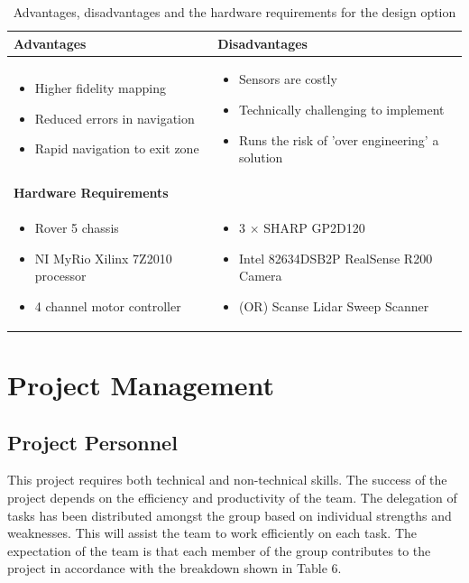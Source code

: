 \documentclass[a4paper]{article}
\begin{document}
\begin{table}[h]
\centering
\caption{Advantages, disadvantages and the hardware requirements for the design option}
\small\begin{tabular}{p{8cm}p{8cm}}
\toprule
\textbf{Advantages} & \textbf{Disadvantages}\\
\midrule
\begin{itemize}\item Higher fidelity mapping \item Reduced errors in navigation \item Rapid navigation to exit zone\end{itemize} &
\begin{itemize}\item Sensors are costly \item Technically challenging to implement \item Runs the risk of 'over engineering' a solution\end{itemize}\\
\midrule
\textbf{Hardware Requirements} & \\
\midrule
\begin{itemize}\item Rover 5 chassis \item NI MyRio Xilinx 7Z2010 processor \item 4 channel motor controller \end{itemize} & \begin{itemize} \item 3 $\times$ SHARP GP2D120 \item Intel 82634DSB2P RealSense R200 Camera \item (OR) Scanse Lidar Sweep Scanner \end{itemize}\\
\bottomrule
\end{tabular}
\end{table}
\section{Project Management}
\subsection{Project Personnel}
This project requires both technical and non-technical skills. The success of the project depends on the efficiency and productivity of the team. The delegation of tasks has been distributed amongst the group based on individual strengths and weaknesses. This will assist the team to work efficiently on each task. The expectation of the team is that each member of the group contributes to the project in accordance with the breakdown shown in Table 6.
\end{document}

